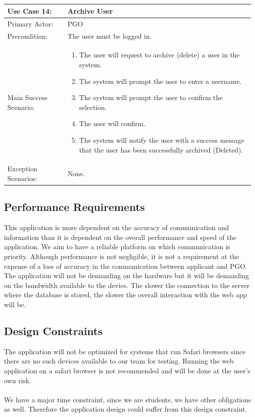 \documentclass{article}
\begin{document}
\\ \\ \\ \\
\begin{tabular}{| m{5cm} | m{10cm} |}
\hline
Use Case 14: & Archive User \\
\hline
Primary Actor: & PGO \\
\hline
Precondition: & The user must be logged in. \\
\hline
Main Success Scenario: & \begin{enumerate} \itemsep0em \item The user will request to archive (delete) a user in the system. 
\item The system will prompt the user to enter a username.
\item The system will prompt the user to confirm the selection.
\item The user will confirm.
\item The system will notify the user with a success message that the user has been successfully archived (Deleted).
\end{enumerate} \\
\hline
Exception Scenarios: & None. \\
\hline
\end{tabular}

\subsection{Performance Requirements}
This application is more dependent on the accuracy of communication and information than it is dependent on the overall performance and speed of the application. We aim to have a reliable platform on which communication is priority. Although performance is not negligible, it is not a requirement at the expense of a loss of accuracy in the communication between applicant and PGO. The application will not be demanding on the hardware but it will be demanding on the bandwidth available to the device. The slower the connection to the server where the database is stored, the slower the overall interaction with the web app will be.

\subsection{Design Constraints}
The application will not be optimized for systems that run Safari browsers since there are no such devices available to our team for testing. Running the web application on a safari browser is not recommended and will be done at the user's own risk. \\ \\
We have a major time constraint, since we are students, we have other obligations as well. Therefore the application design could suffer from this design constraint.
\end{document}
